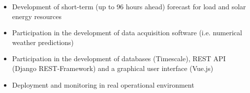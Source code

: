\documentclass{mycv}
\begin{document}
\begin{myitemize}
		\begin{itemize}[itemsep=1px]
			\item Development of short-term (up to 96 hours ahead) forecast for load and solar energy resources
			\item Participation in the development of data acquisition software (i.e. numerical weather predictions)
			\item Participation in the development of databases (Timescale), REST API (Django REST-Framework) and a graphical user interface (Vue.js)
			\item Deployment and monitoring in real operational environment
		\end{itemize}
		
\end{myitemize}	
	\vspace{0.3cm}	
	
\pagebreak
\end{document}
